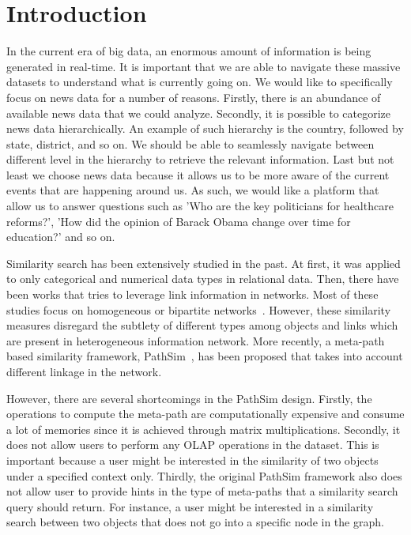 \section{Introduction}
\label{sec:introduction}

In the current era of big data, an enormous amount of information is being
generated in real-time. It is important that we are able to navigate these
massive datasets to understand what is currently going on. We would like to
specifically focus on news data for a number of reasons. Firstly, there is an
abundance of available news data that we could analyze. Secondly, it is
possible to categorize news data hierarchically. An example of such hierarchy
is the country, followed by state, district, and so on. We should be able to
seamlessly navigate between different level in the hierarchy to retrieve the
relevant information. Last but not least we choose news data because it allows
us to be more aware of the current events that are happening around us. As
such, we would like a platform that allow us to answer questions such as 'Who
are the key politicians for healthcare reforms?', 'How did the opinion of
Barack Obama change over time for education?' and so on.

Similarity search has been extensively studied in the past. At first, it was
applied to only categorical and numerical data types in relational data. Then,
there have been works that tries to leverage link information in networks. Most
of these studies focus on homogeneous or bipartite
networks~\cite{page1999pagerank, jeh2002simrank, xu2007scan}. However,
these similarity measures disregard the subtlety of different types among objects and links
which are present in heterogeneous information network. More recently, a
meta-path based similarity framework, PathSim~\cite{sun2011pathsim}, has been proposed
that takes into account different linkage in the network.

However, there are several shortcomings in the PathSim design.
Firstly, the operations to compute the meta-path are computationally expensive
and consume a lot of memories since it is achieved through matrix multiplications.
Secondly, it does not allow users to perform any OLAP operations in the dataset.
This is important because a user might be interested in the similarity of two
objects under a specified context only. Thirdly, the original PathSim framework
also does not allow user to provide hints in the type of meta-paths that a similarity
search query should return. For instance, a user might be interested in a similarity
search between two objects that does not go into a specific node in the graph.

